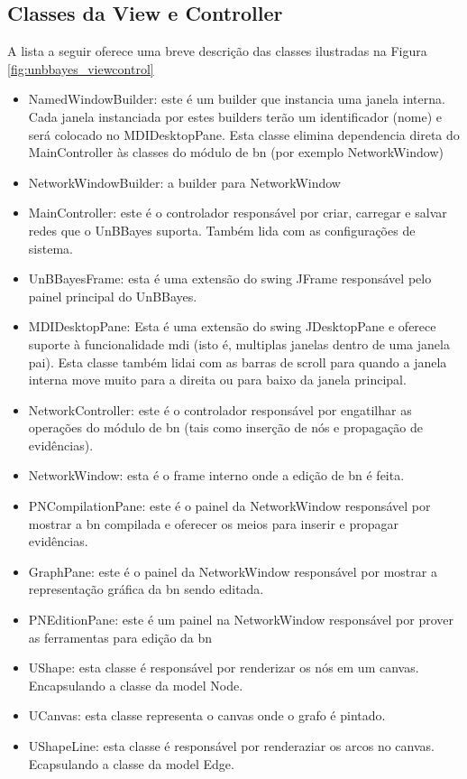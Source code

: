 \subsection{Classes da View e Controller}
A lista a seguir oferece uma breve descrição das classes ilustradas na Figura \ref{fig:unbbayes_viewcontrol}
\begin{itemize}
	\item NamedWindowBuilder: este é um builder que instancia uma janela interna. Cada janela instanciada por estes builders terão um identificador (nome) e será colocado no MDIDesktopPane. Esta classe elimina dependencia direta do MainController às classes do módulo de \gls{bn} (por exemplo NetworkWindow)

	\item NetworkWindowBuilder: a builder para NetworkWindow
	
	\item MainController: este é o controlador responsável por criar, carregar e salvar redes que o UnBBayes suporta. Também lida com as configurações de sistema.
	
	\item UnBBayesFrame: esta é uma extensão do swing JFrame responsável pelo painel principal do UnBBayes.
	
	\item MDIDesktopPane: Esta é uma extensão do swing JDesktopPane e oferece suporte à funcionalidade \gls{mdi} (isto é, multiplas janelas dentro de uma janela pai). Esta classe também lidai com as barras de scroll para quando a janela interna move muito para a direita ou para baixo da janela principal.
	
	\item NetworkController: este é o controlador responsável por engatilhar as operações do módulo de \gls{bn} (tais como inserção de nós e propagação de evidências).

	\item NetworkWindow: esta é o frame interno onde a edição de \gls{bn} é feita.

	\item PNCompilationPane: este é o painel da NetworkWindow responsável por mostrar a \gls{bn} compilada e oferecer os meios para inserir e propagar evidências.
	
	\item GraphPane: este é o painel da NetworkWindow responsável por mostrar a representação gráfica da \gls{bn} sendo editada.

	\item PNEditionPane: este é um painel na NetworkWindow responsável por prover as ferramentas para edição da \gls{bn}
	
	\item UShape: esta classe é responsável por renderizar os nós em um canvas. Encapsulando a classe da model Node.

	\item UCanvas: esta classe representa o canvas onde o grafo é pintado.

	\item UShapeLine: esta classe é responsável por renderaziar os arcos no canvas. Ecapsulando a classe da model Edge.
\end{itemize}

